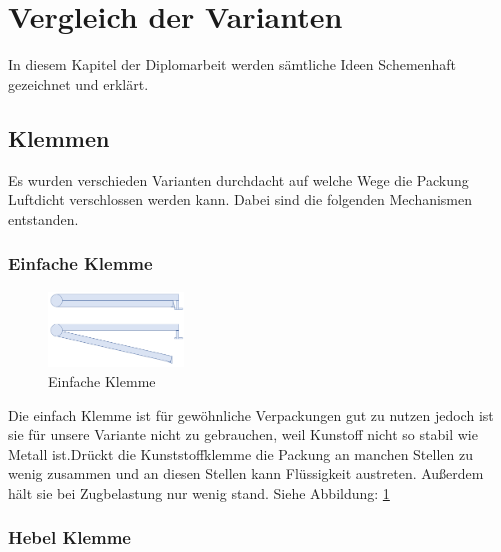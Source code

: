 \section{Vergleich der Varianten}

In diesem Kapitel der Diplomarbeit werden sämtliche Ideen Schemenhaft gezeichnet und erklärt.
 
\subsection{Klemmen}

Es wurden verschieden Varianten durchdacht auf welche Wege die Packung Luftdicht verschlossen werden kann. Dabei sind die folgenden Mechanismen entstanden.

\subsubsection{Einfache Klemme}

\begin{figure}
\vspace{-20pt}
  \begin{center}
    \includegraphics[width=0.32\textwidth]{Bilder/Powerpoint/Einfach_Klemme}
  \end{center}
  \caption{Einfache Klemme}
  \label{Einfache Klemme}
  \vspace{-10pt}
\end{figure}

Die einfach Klemme ist für gewöhnliche Verpackungen gut zu nutzen jedoch ist sie für unsere Variante nicht zu gebrauchen, weil Kunstoff nicht so stabil wie Metall ist.Drückt die Kunststoffklemme die Packung an manchen Stellen zu wenig zusammen und an diesen Stellen kann Flüssigkeit austreten. Außerdem hält sie bei Zugbelastung nur wenig stand. Siehe Abbildung: \ref{Einfache Klemme}

\subsubsection{Hebel Klemme} 

